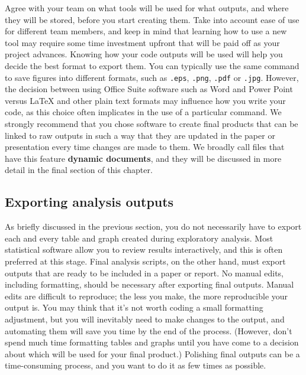 Agree with your team on what tools will be used for what outputs,
and where they will be stored, before you start creating them.
Take into account ease of use for different team members, and
keep in mind that learning how to use a new tool may require some
time investment upfront that will be paid off as your project advances.
Knowing how your code outputs will be used will help you decide the best format to export them.
You can typically use the same command to save figures into different formats,
such as \texttt{.eps}, \texttt{.png}, \texttt{.pdf} or \texttt{.jpg}.
However, the decision between using Office Suite software such as Word and Power Point
versus {\LaTeX} and other plain text formats may influence how you write your code,
as this choice often implicates in the use of a particular command.
We strongly recommend that you chose software to create final products
that can be linked to raw outputs in such a way that they are updated
in the paper or presentation every time changes are made to them.
We broadly call files that have this feature \textbf{dynamic documents},
and they will be discussed in more detail in the final section of this chapter.


\subsection{Exporting analysis outputs}

As briefly discussed in the previous section,
you do not necessarily have to export each and every table and graph
created during exploratory analysis.
Most statistical software allow you to review results interactively,
and this is often preferred at this stage.
Final analysis scripts, on the other hand, must export outputs
that are ready to be included in a paper or report.
No manual edits, including formatting,
should be necessary after exporting final outputs.
Manual edits are difficult to reproduce;
the less you make, the more reproducible your output is.
You may think that it's not worth coding a small formatting adjustment,
but you will inevitably need to make changes to the output,
and automating them will save you time by the end of the process.
(However, don't spend much time formatting tables and graphs until
you have come to a decision about which will be used for your final product.)
Polishing final outputs can be a time-consuming process,
and you want to do it as few times as possible.

